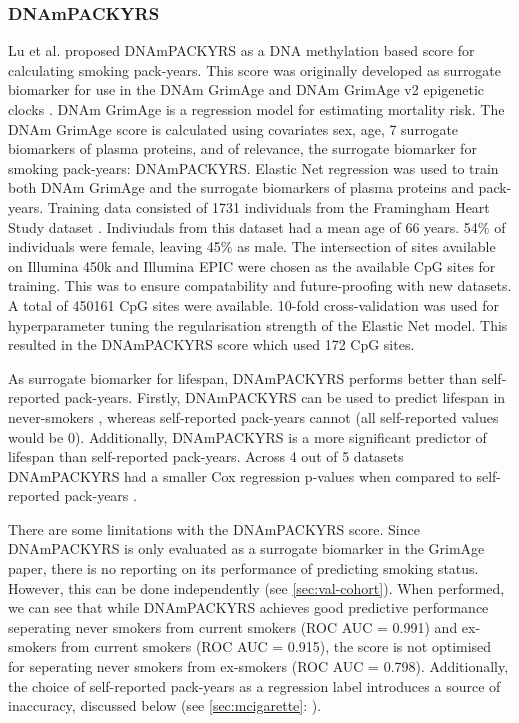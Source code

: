 \documentclass{article}
\begin{document}
\subsubsection{DNAmPACKYRS} \label{sec:dnampackyrs}
Lu et al. \cite{lu2019dna} proposed DNAmPACKYRS as a DNA methylation based score for calculating smoking pack-years. This score was originally developed as surrogate biomarker for use in the DNAm GrimAge and DNAm GrimAge v2 epigenetic clocks \cite{lu2019dna,lu2022dna}. DNAm GrimAge is a regression model for estimating mortality risk. The DNAm GrimAge score is calculated using covariates sex, age, 7 surrogate biomarkers of plasma proteins, and of relevance, the surrogate biomarker for smoking pack-years: DNAmPACKYRS. Elastic Net regression was used to train both DNAm GrimAge and the surrogate biomarkers of plasma proteins and pack-years. Training data consisted of 1731 individuals from the Framingham Heart Study dataset \cite{doi:10.2105/AJPH.41.3.279}. Indiviudals from this dataset had a mean age of 66 years. 54\% of individuals were female, leaving 45\% as male. The intersection of sites available on Illumina 450k and Illumina EPIC were chosen as the available CpG sites for training. This was to ensure compatability and future-proofing with new datasets. A total of \num{450161} CpG sites were available. 10-fold cross-validation was used for hyperparameter tuning the regularisation strength of the Elastic Net model. This resulted in the DNAmPACKYRS score which used 172 CpG sites.

As surrogate biomarker for lifespan, DNAmPACKYRS performs better than self-reported pack-years. Firstly, DNAmPACKYRS can be used to predict lifespan in never-smokers \cite{lu2019dna}, whereas self-reported pack-years cannot (all self-reported values would be 0). Additionally, DNAmPACKYRS is a more significant predictor of lifespan than self-reported pack-years. Across 4 out of 5 datasets DNAmPACKYRS had a smaller Cox regression p-values when compared to self-reported pack-years \cite{lu2019dna}.

There are some limitations with the DNAmPACKYRS score. Since DNAmPACKYRS is only evaluated as a surrogate biomarker in the GrimAge paper, there is no reporting on its performance of predicting smoking status. However, this can be done independently (see \ref{sec:val-cohort}). When performed, we can see that while DNAmPACKYRS achieves good predictive performance seperating never smokers from current smokers (ROC AUC = 0.991) and ex-smokers from current smokers (ROC AUC = 0.915), the score is not optimised for seperating never smokers from ex-smokers (ROC AUC = 0.798). Additionally, the choice of self-reported pack-years as a regression label introduces a source of inaccuracy, discussed below (see \ref{sec:mcigarette}: ).
\end{document}
